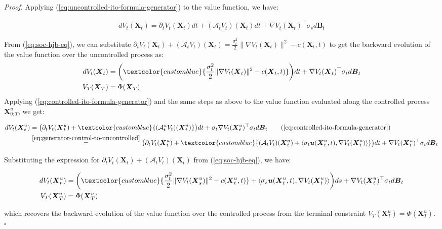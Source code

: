 \documentclass{article}
\newcommand{\bluetext}[1]{\textcolor{customblue}{#1}}
\begin{document}
\textit{Proof.} Applying (\ref{eq:uncontrolled-ito-formula-generator}) to the value function, we have:
\begin{small}
\begin{align}
    dV_t(\boldsymbol{X}_t)=\partial_tV_t(\boldsymbol{X}_t)dt+(\mathcal{A}_tV_t)(\boldsymbol{X}_t)dt +\nabla V_t(\boldsymbol{X}_t)^\top \sigma_sd\boldsymbol{B}_t
\end{align}
\end{small}
From (\ref{eq:soc-hjb-eq}), we can substitute $\partial_tV_t(\boldsymbol{X}_t)+(\mathcal{A}_tV_t)(\boldsymbol{X}_t)=\frac{\sigma_t^2}{2}\|\nabla V_t(\boldsymbol{X}_t)\|^2-c(\boldsymbol{X}_t,t)$ to get the backward evolution of the value function over the uncontrolled process as:
\begin{align}
    dV_t(\boldsymbol{X}_t)&=\bigg(\bluetext{\frac{\sigma_t^2}{2}\|\nabla V_t(\boldsymbol{X}_t)\|^2-c(\boldsymbol{X}_t,t)}\bigg)dt + \nabla V_t(\boldsymbol{X}_t)^\top \sigma_td\boldsymbol{B}_t\nonumber\\
    V_T(\boldsymbol{X}_T)&=\Phi(\boldsymbol{X}_T)
\end{align}
Applying (\ref{eq:controlled-ito-formula-generator}) and the same steps as above to the value function evaluated along the controlled process $\boldsymbol{X}^u_{0:T}$, we get:
\begin{small}
\begin{align}
    dV_t(\boldsymbol{X}^u_t)&=\big(\partial_tV_t(\boldsymbol{X}^u_t)+\bluetext{(\mathcal{A}^u_tV_t)(\boldsymbol{X}^u_t)}\big)dt + \sigma_t\nabla V_t(\boldsymbol{X}^u_t)^\top \sigma_td\boldsymbol{B}_t\tag{\ref{eq:controlled-ito-formula-generator}}\\
    &\overset{\ref{eq:generator-control-to-uncontrolled}}{=}\big(\partial_tV_t(\boldsymbol{X}^u_t)+\bluetext{(\mathcal{A}_tV_t)(\boldsymbol{X}^u_t)+\langle \sigma_t\boldsymbol{u}(\boldsymbol{X}_t^u,t),\nabla V_t(\boldsymbol{X}_t^u)\rangle}\big)dt + \nabla V_t(\boldsymbol{X}^u_t)^\top \sigma_td\boldsymbol{B}_t
\end{align}
\end{small}
Substituting the expression for $\partial_tV_t(\boldsymbol{X}_t)+(\mathcal{A}_tV_t)(\boldsymbol{X}_t)$ from (\ref{eq:soc-hjb-eq}), we have:
\begin{small}
\begin{align}
    dV_t(\boldsymbol{X}^u_t)&=\bigg(\bluetext{\frac{\sigma_t^2}{2}\|\nabla V_t(\boldsymbol{X}^u_s)\|^2-c(\boldsymbol{X}^u_t,t)}+\langle \sigma_s\boldsymbol{u}(\boldsymbol{X}^u_t,t), \nabla V_t(\boldsymbol{X}^u_t)\rangle\bigg)ds + \nabla V_t(\boldsymbol{X}^u_t)^\top \sigma_t d\boldsymbol{B}_t\\ V_T(\boldsymbol{X}^u_T)&=\Phi(\boldsymbol{X}_T^u)
\end{align}
\end{small}
which recovers the backward evolution of the value function over the controlled process from the terminal constraint $V_T(\boldsymbol{X}^u_T)=\Phi(\boldsymbol{X}_T^u)$. \hfill $\square$
\end{document}
